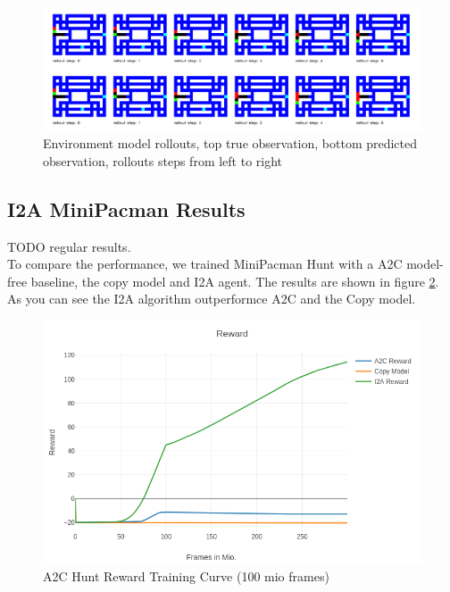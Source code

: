 \begin{figure}[H] 
  \centering   
  \includegraphics[width=\columnwidth]{./Images/env_model_rollouts.png}
  \caption{Environment model rollouts, top true observation, bottom predicted observation, rollouts steps from left to right} 
  \label{fig:environment_model_rollouts} 
\end{figure} 



\subsection{I2A MiniPacman Results}

TODO regular results.\\

To compare the performance, we trained MiniPacman Hunt with a A2C model-free baseline, the copy model and I2A agent. The results are shown in figure \ref{fig:mini_pacman_hunt_rewards}. As you can see the I2A algorithm outperformce A2C and the Copy model.


\begin{figure}[H] 
  \centering   
  \includegraphics[width=0.9\columnwidth]{./Images/hunt_rewards_compare.png}
  \caption{A2C Hunt Reward Training Curve (100 mio frames)} 
  \label{fig:mini_pacman_hunt_rewards} 
\end{figure} 
